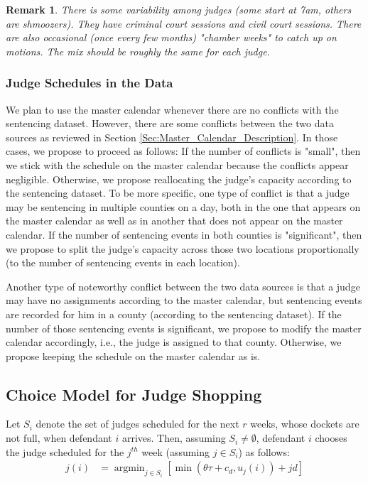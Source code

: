 \documentclass[11pt, oneside]{article}   	%
\theoremstyle{ModifiedStyle}
\newtheorem{remark}{Remark}
\DeclareMathOperator*{\argmin}{argmin}
\begin{document}
\begin{remark}
	There is some variability among judges (some start at 7am, others are shmoozers). They have criminal court sessions and civil court sessions. There are also occasional (once every few months) "chamber weeks" to catch up on motions. The mix should be roughly the same for each judge.
\end{remark}



\subsubsection{Judge Schedules in the Data}
We plan to use the master calendar whenever there are no conflicts with the sentencing dataset. However, there are some conflicts between the two data sources as reviewed in Section \ref{Sec:Master_Calendar_Description}. In those cases, we propose to proceed as follows: If the number of conflicts is "small", then we stick with the schedule on the master calendar because the conflicts appear negligible. Otherwise, we propose reallocating the judge's capacity according to the sentencing dataset. To be more specific, one type of conflict is that a judge may be sentencing in multiple counties on a day, both in the one that appears on the master calendar as well as in another that does not appear on the master calendar. If the number of sentencing events in both counties is "significant", then we propose to split the judge's capacity across those two locations proportionally (to the number of sentencing events in each location).

Another type of noteworthy conflict between the two data sources is that a judge may have no assignments according to the master calendar, but sentencing events are recorded for him in a county (according to the sentencing dataset). If the number of those sentencing events is significant, we propose to modify the master calendar accordingly, i.e., the judge is assigned to that county. Otherwise, we propose keeping the schedule on the master calendar as is.


\subsection{Choice Model for Judge Shopping}
Let $S_i$ denote the set of judges scheduled for the next $r$ weeks, whose dockets are not full, when defendant $i$ arrives. Then, assuming $S_i \neq \emptyset$, defendant $i$ chooses the judge scheduled for the $j^{th}$ week (assuming $j \in S_i$) as follows:
\begin{align*}
		j(i) &= \argmin_{j \in S_i} [\min(\theta \tau + c_d,u_j(i)) + jd]
\end{align*}
\end{document}
